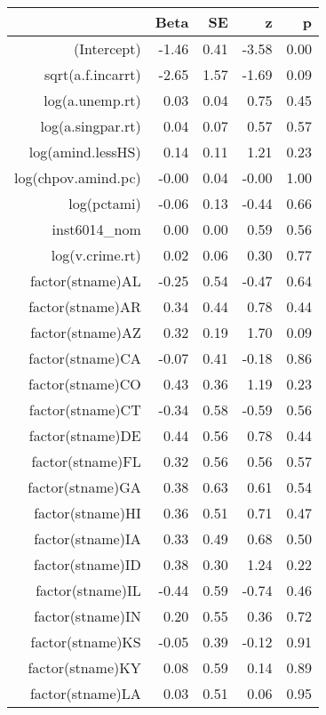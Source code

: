 \begin{table}[ht]
\centering
\begin{tabular}{rrrrr}
  \hline
 & Beta & SE & z & p \\ 
  \hline
(Intercept) & -1.46 & 0.41 & -3.58 & 0.00 \\ 
  sqrt(a.f.incarrt) & -2.65 & 1.57 & -1.69 & 0.09 \\ 
  log(a.unemp.rt) & 0.03 & 0.04 & 0.75 & 0.45 \\ 
  log(a.singpar.rt) & 0.04 & 0.07 & 0.57 & 0.57 \\ 
  log(amind.lessHS) & 0.14 & 0.11 & 1.21 & 0.23 \\ 
  log(chpov.amind.pc) & -0.00 & 0.04 & -0.00 & 1.00 \\ 
  log(pctami) & -0.06 & 0.13 & -0.44 & 0.66 \\ 
  inst6014\_nom & 0.00 & 0.00 & 0.59 & 0.56 \\ 
  log(v.crime.rt) & 0.02 & 0.06 & 0.30 & 0.77 \\ 
  factor(stname)AL & -0.25 & 0.54 & -0.47 & 0.64 \\ 
  factor(stname)AR & 0.34 & 0.44 & 0.78 & 0.44 \\ 
  factor(stname)AZ & 0.32 & 0.19 & 1.70 & 0.09 \\ 
  factor(stname)CA & -0.07 & 0.41 & -0.18 & 0.86 \\ 
  factor(stname)CO & 0.43 & 0.36 & 1.19 & 0.23 \\ 
  factor(stname)CT & -0.34 & 0.58 & -0.59 & 0.56 \\ 
  factor(stname)DE & 0.44 & 0.56 & 0.78 & 0.44 \\ 
  factor(stname)FL & 0.32 & 0.56 & 0.56 & 0.57 \\ 
  factor(stname)GA & 0.38 & 0.63 & 0.61 & 0.54 \\ 
  factor(stname)HI & 0.36 & 0.51 & 0.71 & 0.47 \\ 
  factor(stname)IA & 0.33 & 0.49 & 0.68 & 0.50 \\ 
  factor(stname)ID & 0.38 & 0.30 & 1.24 & 0.22 \\ 
  factor(stname)IL & -0.44 & 0.59 & -0.74 & 0.46 \\ 
  factor(stname)IN & 0.20 & 0.55 & 0.36 & 0.72 \\ 
  factor(stname)KS & -0.05 & 0.39 & -0.12 & 0.91 \\ 
  factor(stname)KY & 0.08 & 0.59 & 0.14 & 0.89 \\ 
  factor(stname)LA & 0.03 & 0.51 & 0.06 & 0.95 \\ 

\end{tabular}
\end{table}
